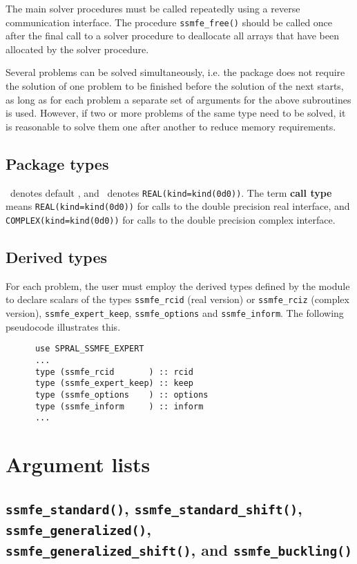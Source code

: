 The main solver procedures
must be called repeatedly using
a reverse communication interface.
The procedure \texttt{ssmfe\_free()} 
should be called once after the
final call to 
a solver procedure
to deallocate all arrays 
that have been allocated by
the solver procedure.

Several problems can be solved simultaneously,
i.e. the package does not require the solution of
one problem to be finished before the solution of
the next starts, as long as for each problem a separate set
of arguments for the above subroutines is used.
However, if two or more problems of the same type
need to be solved, it is reasonable to solve them one
after another  to reduce  memory requirements.
\fi

\subsection{Package types} 

\Integer\ denotes default \Integer, and \REALDP\ denotes
\texttt{REAL(kind=kind(0d0))}. The term {\bf call type} means
\texttt{REAL(kind=kind(0d0))} for calls to the double precision real
interface, and \texttt{COMPLEX(kind=kind(0d0))} for calls to the double
precision complex interface.

\subsection{Derived types}
\label{derived types}

For each problem, the user must employ the derived types defined by the
module to declare scalars of the types 
{\tt ssmfe\_rcid} (real version) or 
{\tt ssmfe\_rciz} (complex version), 
{\tt ssmfe\_expert\_keep},
{\tt ssmfe\_options} and 
{\tt ssmfe\_inform}.
The following pseudocode illustrates this.
\begin{verbatim}
      use SPRAL_SSMFE_EXPERT
      ...
      type (ssmfe_rcid       ) :: rcid
      type (ssmfe_expert_keep) :: keep
      type (ssmfe_options    ) :: options
      type (ssmfe_inform     ) :: inform
      ...
\end{verbatim}


\section{Argument lists}

\subsection{%
   \texttt{ssmfe\_standard()},
   \texttt{ssmfe\_standard\_shift()},
   \texttt{ssmfe\_generalized()},\\
   \texttt{ssmfe\_generalized\_shift()}, and
   \texttt{ssmfe\_buckling()}
}

